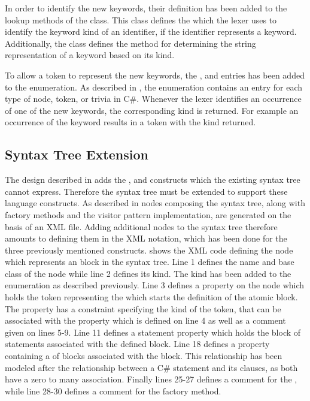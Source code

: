 In order to identify the new keywords, their definition has been added to the lookup methods of the  class. This class defines the  which the lexer uses to identify the keyword kind of an identifier, if the identifier represents a keyword. Additionally, the  class defines the  method for determining the string representation of a keyword based on its kind.

To allow a token to represent the new keywords, the ,  and  entries has been added to the  enumeration. As described in , the  enumeration contains an entry for each type of node, token, or trivia in C\#. Whenever the lexer identifies an occurrence of one of the new keywords, the corresponding kind is  returned. For example an occurrence of the  keyword results in a token with the kind  returned.

\subsection{Syntax Tree Extension}
The design described in  adds the ,  and  constructs which the existing syntax tree cannot express. Therefore the syntax tree must be extended to support these language constructs. As described in  nodes composing the syntax tree, along with factory methods and the visitor pattern implementation, are generated on the basis of an \ac{XML} file. Adding additional nodes to the syntax tree therefore amounts to defining them in the \ac{XML} notation, which has been done for the three previously mentioned constructs.  shows the \ac{XML} code defining the  node which represents an  block in the syntax tree. Line 1 defines the name and base class of the node while line 2 defines its kind. The  kind has been added to the  enumeration as described previously. Line 3 defines a property on the node which holds the token representing the  which starts the definition of the atomic block. The property has a constraint specifying the kind of the token, that can be associated with the property which is defined on line 4 as well as a comment given on lines 5-9. Line 11 defines a statement property which holds the block of statements associated with the defined  block. Line 18 defines a property containing a  of  blocks associated with the  block. This relationship has been modeled after the relationship between a C\#  statement and its  clauses, as both have a zero to many association. Finally lines 25-27 defines a comment for the , while line 28-30 defines a comment for the factory method.

